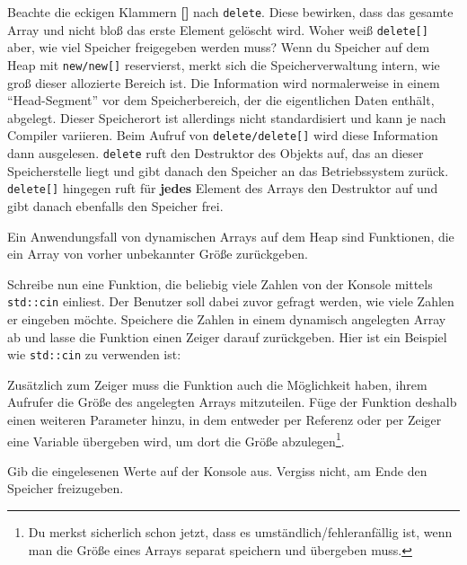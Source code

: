 
Beachte die eckigen Klammern \textbf{[]} nach \lstinline{delete}.
Diese bewirken, dass das gesamte Array und nicht bloß das erste Element gelöscht wird.
Woher weiß \lstinline{delete[]} aber, wie viel Speicher freigegeben werden muss? 
Wenn du Speicher auf dem Heap mit \lstinline{new/new[]} reservierst, merkt sich die Speicherverwaltung intern, wie groß dieser allozierte Bereich ist. 
Die Information wird normalerweise in einem ``Head-Segment'' vor dem Speicherbereich, der die eigentlichen Daten enthält, abgelegt.
Dieser Speicherort ist allerdings nicht standardisiert und kann je nach Compiler variieren.
Beim Aufruf von \lstinline{delete/delete[]} wird diese Information dann ausgelesen. 
\lstinline{delete} ruft den Destruktor des Objekts auf, das an dieser Speicherstelle liegt und gibt danach den Speicher an das Betriebssystem zurück. \lstinline{delete[]} hingegen ruft für \textbf{jedes} Element des Arrays den Destruktor auf und gibt danach ebenfalls den Speicher frei.

Ein Anwendungsfall von dynamischen Arrays auf dem Heap sind Funktionen, die ein Array von vorher unbekannter Größe zurückgeben.

Schreibe nun eine Funktion, die beliebig viele Zahlen von der Konsole mittels \lstinline{std::cin} einliest.
Der Benutzer soll dabei zuvor gefragt werden, wie viele Zahlen er eingeben möchte.
Speichere die Zahlen in einem dynamisch angelegten Array ab und lasse die Funktion einen Zeiger darauf zurückgeben.
Hier ist ein Beispiel wie \lstinline{std::cin} zu verwenden ist:


Zusätzlich zum Zeiger muss die Funktion auch die Möglichkeit haben, ihrem Aufrufer die Größe des angelegten Arrays mitzuteilen.
Füge der Funktion deshalb einen weiteren Parameter hinzu, in dem entweder per Referenz oder per Zeiger eine Variable übergeben wird, um dort die Größe abzulegen\footnote{Du merkst sicherlich schon jetzt, dass es umständlich/fehleranfällig ist, wenn man die Größe eines Arrays separat speichern und übergeben muss.}.

Gib die eingelesenen Werte auf der Konsole aus.
Vergiss nicht, am Ende den Speicher freizugeben.
